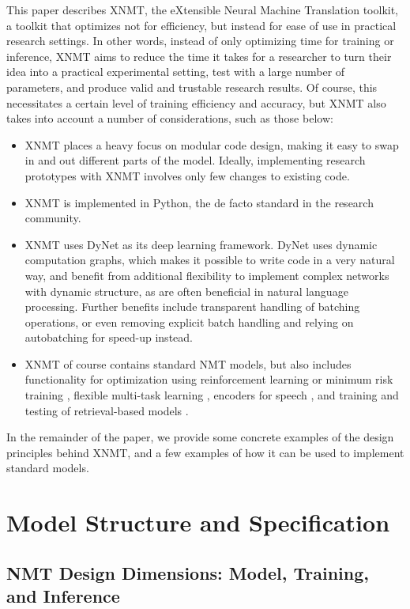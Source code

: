 \documentclass[]{article}
\begin{document}
This paper describes XNMT, the eXtensible Neural Machine Translation toolkit, a toolkit that optimizes not for efficiency, but instead for ease of use in practical research settings.
In other words, instead of only optimizing time for training or inference, XNMT aims to reduce the time it takes for a researcher to turn their idea into a practical experimental setting, test with a large number of parameters, and produce valid and trustable research results.
Of course, this necessitates a certain level of training efficiency and accuracy, but XNMT also takes into account a number of considerations, such as those below:
\begin{itemize}
\setlength{\itemsep}{0.5pt}
\item XNMT places a heavy focus on modular code design, making it easy to swap in and out different parts of the model. Ideally, implementing research prototypes with XNMT involves only few changes to existing code.
\item XNMT is implemented in Python, the de facto standard in the research community.
\item XNMT uses DyNet \citep{Neubig2017} as its deep learning framework. DyNet uses dynamic computation graphs, which makes it possible to write code in a very natural way, and benefit from additional flexibility to implement complex networks with dynamic structure, as are often beneficial in natural language processing. Further benefits include transparent handling of batching operations, or even removing explicit batch handling and relying on autobatching for speed-up instead.
\item XNMT of course contains standard NMT models, but also includes functionality for optimization using reinforcement learning \citep{ranzato2015sequence} or minimum risk training \citep{shen-EtAl:2016:P16-1}, flexible multi-task learning \citep{dai2015semi}, encoders for speech \citep{chan2016listen}, and training and testing of retrieval-based models \citep{huang2013learning}.
\end{itemize}

In the remainder of the paper, we provide some concrete examples of the design principles behind XNMT, and a few examples of how it can be used to implement standard models.

\section{Model Structure and Specification}

\subsection{NMT Design Dimensions: Model, Training, and Inference}
\label{sec:nmtdesign}
\end{document}
